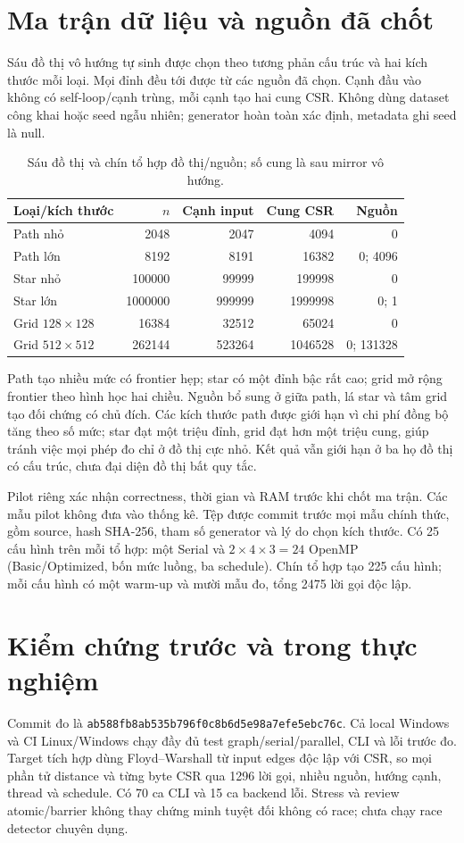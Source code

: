 \section{Ma trận dữ liệu và nguồn đã chốt}
Sáu đồ thị vô hướng tự sinh được chọn theo tương phản cấu trúc và hai kích thước mỗi loại. Mọi đỉnh đều tới được từ các nguồn đã chọn. Cạnh đầu vào không có self-loop/cạnh trùng, mỗi cạnh tạo hai cung CSR. Không dùng dataset công khai hoặc seed ngẫu nhiên; generator hoàn toàn xác định, metadata ghi seed là null.
\begin{table}[htbp]
\centering\small
\caption{Sáu đồ thị và chín tổ hợp đồ thị/nguồn; số cung là sau mirror vô hướng.}
\label{tab:measured-datasets}
\begin{tabular}{lrrrr}
\toprule
Loại/kích thước & $n$ & Cạnh input & Cung CSR & Nguồn \\
\midrule
Path nhỏ & 2048 & 2047 & 4094 & 0 \\
Path lớn & 8192 & 8191 & 16382 & 0; 4096 \\
Star nhỏ & 100000 & 99999 & 199998 & 0 \\
Star lớn & 1000000 & 999999 & 1999998 & 0; 1 \\
Grid $128\times128$ & 16384 & 32512 & 65024 & 0 \\
Grid $512\times512$ & 262144 & 523264 & 1046528 & 0; 131328 \\
\bottomrule
\end{tabular}
\end{table}

Path tạo nhiều mức có frontier hẹp; star có một đỉnh bậc rất cao; grid mở rộng frontier theo hình học hai chiều. Nguồn bổ sung ở giữa path, lá star và tâm grid tạo đối chứng có chủ đích. Các kích thước path được giới hạn vì chi phí đồng bộ tăng theo số mức; star đạt một triệu đỉnh, grid đạt hơn một triệu cung, giúp tránh việc mọi phép đo chỉ ở đồ thị cực nhỏ. Kết quả vẫn giới hạn ở ba họ đồ thị có cấu trúc, chưa đại diện đồ thị bất quy tắc.

Pilot riêng xác nhận correctness, thời gian và RAM trước khi chốt ma trận. Các mẫu pilot không đưa vào thống kê. Tệp  được commit trước mọi mẫu chính thức, gồm source, hash SHA-256, tham số generator và lý do chọn kích thước. Có 25 cấu hình trên mỗi tổ hợp: một Serial và $2\times4\times3=24$ OpenMP (Basic/Optimized, bốn mức luồng, ba schedule). Chín tổ hợp tạo 225 cấu hình; mỗi cấu hình có một warm-up và mười mẫu đo, tổng 2475 lời gọi độc lập.

\section{Kiểm chứng trước và trong thực nghiệm}
Commit đo là \texttt{ab588fb8ab535b796f0c8b6d5e98a7efe5ebc76c}. Cả local Windows và CI Linux/Windows chạy đầy đủ test graph/serial/parallel, CLI và lỗi trước đo. Target tích hợp dùng Floyd--Warshall từ input edges độc lập với CSR, so mọi phần tử distance và từng byte CSR qua 1296 lời gọi, nhiều nguồn, hướng cạnh, thread và schedule. Có 70 ca CLI và 15 ca backend lỗi. Stress và review atomic/barrier không thay chứng minh tuyệt đối không có race; chưa chạy race detector chuyên dụng.

